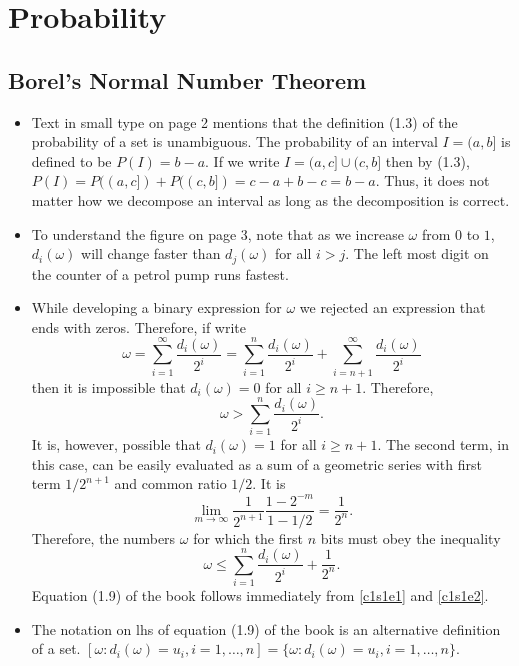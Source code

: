 \chapter{Probability}\label{c1}
\section{Borel's Normal Number Theorem}\label{c1s1}
\begin{itemize}
\item Text in small type on page 2 mentions that the definition (1.3) of the
probability of a set is unambiguous. The probability of an interval $I = (a, b]$
is defined to be $P(I) = b - a$. If we write $I = (a, c] \cup (c, b]$ then by
(1.3), $P(I) = P((a, c]) + P((c, b]) = c - a + b - c = b - a$. Thus, it does not
matter how we decompose an interval as long as the decomposition is correct.

\item To understand the figure on page 3, note that as we increase $\omega$ 
from $0$ to $1$, $d_i(\omega)$ will change faster than $d_j(\omega)$ for all
$i > j$. The left most digit on the counter of a petrol pump runs fastest.

\item While developing a binary expression for $\omega$ we rejected an 
expression that ends with zeros. Therefore, if write
\[
\omega = \sum_{i=1}^\infty \frac{d_i(\omega)}{2^i} = 
\sum_{i=1}^n\frac{d_i(\omega)}{2^i} + \sum_{i=n+1}^\infty\frac{d_i(\omega)}{2^i}
\]
then it is impossible that $d_i(\omega) = 0$ for all $i \ge n + 1$. Therefore,
\begin{equation}\label{c1s1e1}
\omega > \sum_{i=1}^n\frac{d_i(\omega)}{2^i}.
\end{equation}
It is, however, possible that $d_i(\omega) = 1$ for all $i \ge n + 1$. The
second term, in this case, can be easily evaluated as a sum of a geometric
series with first term $1/2^{n+1}$ and common ratio $1/2$. It is
\[
\lim_{m \rightarrow \infty}\frac{1}{2^{n+1}}\frac{1 - 2^{-m}}{1 - 1/2} = 
\frac{1}{2^n}.
\]
Therefore, the numbers $\omega$ for which the first $n$ bits must obey the 
inequality
\begin{equation}\label{c1s1e2}
\omega \le \sum_{i=1}^n\frac{d_i(\omega)}{2^i} + \frac{1}{2^n}.
\end{equation}
Equation (1.9) of the book follows immediately from \eqref{c1s1e1} and 
\eqref{c1s1e2}.

\item The notation on lhs of equation (1.9) of the book is an alternative 
definition of a set. $[\omega : d_i(\omega) = u_i, i = 1, \ldots, n] = \{
\omega : d_i(\omega) = u_i, i = 1, \ldots, n\}$.


\end{itemize}
